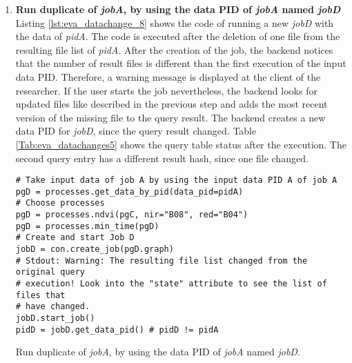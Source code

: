 \documentclass[draft,final]{vutinfth} %
\newenvironment{code}{\captionsetup{type=listing}}{}
\begin{document}
\begin{enumerate}
	\begin{code}
		\begin{verbatim} 
[{'timestamp': '2019-03-31 17:44:43', 
'path': '/eodc/products/copernicus.eu/s2a_prd_msil1c/2017/05/24/
S2A_MSIL1C_20170524T101031_N0205_R022_T32TQR_20170524T101353_new.zip'}]
		\end{verbatim}
		\caption{List of files that replaced original files of the query result.}
		\label{lst:eva_datachange_state}
	\end{code}

	\item \textbf{Run duplicate of \textit{jobA}, by using the data PID of \textit{jobA} named \textit{jobD}}\\
	Listing \ref{lst:eva_datachange_8} shows the code of running a new \textit{jobD} with the data of \textit{pidA}. The code is executed after the deletion of one file from the resulting file list of \textit{pidA}. After the creation of the job, the backend notices that the number of result files is different than the first execution of the input data PID. Therefore, a warning message is displayed at the client of the researcher. If the user starts the job nevertheless, the backend looks for updated files like described in the previous step and adds the most recent version of the missing file to the query result. The backend creates a new data PID for \textit{jobD}, since the query result changed. Table \ref{Tab:eva_datachanges5} shows the query table status after the execution. The second query entry has a different result hash, since one file changed. 
	\begin{code}
		\begin{verbatim}
# Take input data of job A by using the input data PID A of job A
pgD = processes.get_data_by_pid(data_pid=pidA)
# Choose processes
pgD = processes.ndvi(pgC, nir="B08", red="B04")
pgD = processes.min_time(pgD)
# Create and start Job D
jobD = con.create_job(pgD.graph)
# Stdout: Warning: The resulting file list changed from the original query
# execution! Look into the "state" attribute to see the list of files that
# have changed. 
jobD.start_job()
pidD = jobD.get_data_pid() # pidD != pidA
		\end{verbatim}
		\caption{Run duplicate of \textit{jobA}, by using the data PID of \textit{jobA} named \textit{jobD}.}
		\label{lst:eva_datachange_8}
	\end{code}


\end{enumerate}
\end{document}

